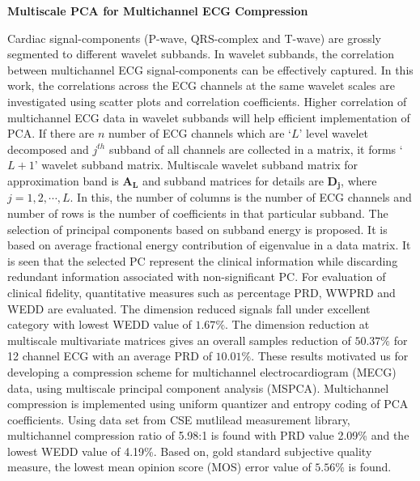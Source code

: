 \vspace{0.3in}
\noindent \textbf{\Large{Multiscale PCA for Multichannel ECG
Compression}} \label{MSPCA-MECG}
\vspace{0.2in}

\noindent Cardiac signal-components (P-wave, QRS-complex and
T-wave) are grossly segmented to different wavelet subbands. In
wavelet subbands, the correlation between multichannel ECG
signal-components can be effectively captured. In this work, the
correlations across the ECG channels at the same wavelet scales
are investigated using scatter plots and correlation coefficients.
Higher correlation of multichannel ECG data in wavelet subbands
will help efficient implementation of PCA.   If there are $n$
number of ECG channels which are `$L$' level wavelet decomposed
and $j^{th}$ subband of all channels are collected in a matrix, it
forms `$L+1$' wavelet subband matrix. Multiscale wavelet subband
matrix for approximation band is $\mathbf{A_{L}}$ and subband
matrices for details are $\mathbf{D_{j}}$, where $j=1, 2, \cdots,
L$. In this, the number of columns is the number of ECG channels
and number of rows is the number of coefficients in that
particular subband.  The selection of principal components based
on subband energy is proposed.  It is based on average fractional
energy contribution of eigenvalue in a data matrix. It is seen
that the selected PC represent the clinical information while
discarding redundant information associated with non-significant
PC. For evaluation of clinical fidelity, quantitative measures
such as percentage PRD, WWPRD and WEDD are evaluated. The
dimension reduced signals fall under excellent category with
lowest WEDD value of $1.67\%$. The dimension reduction at
multiscale multivariate matrices gives an overall samples
reduction of $50.37\%$ for 12 channel ECG with an average PRD of
$10.01\%$. These results motivated us for developing a compression
scheme for multichannel electrocardiogram (MECG) data, using
multiscale principal component analysis (MSPCA).  Multichannel
compression is implemented using uniform quantizer and entropy
coding of PCA coefficients.  Using data set from CSE mutlilead
measurement library, multichannel compression ratio of 5.98:1 is
found with PRD value 2.09\% and the lowest WEDD value of 4.19\%.
Based on, gold standard subjective quality measure, the lowest
mean opinion score (MOS) error value of $5.56\%$ is found.


